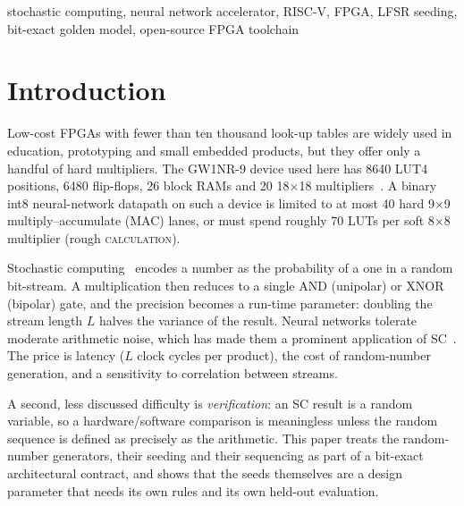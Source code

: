 \documentclass[conference]{IEEEtran}
\newcommand{\lbl}[1]{\textsc{#1}}    %
\begin{document}
\begin{IEEEkeywords}
stochastic computing, neural network accelerator, RISC-V, FPGA, LFSR seeding,
bit-exact golden model, open-source FPGA toolchain
\end{IEEEkeywords}

\section{Introduction}
\label{sec:intro}

Low-cost FPGAs with fewer than ten thousand look-up tables are widely used in
education, prototyping and small embedded products, but they offer only a
handful of hard multipliers. The GW1NR-9 device used here has 8640 LUT4
positions, 6480 flip-flops, 26 block RAMs and 20 18$\times$18
multipliers~\cite{sipeed_tn9k}.
A binary int8 neural-network datapath on such a device is limited to at most
40 hard 9$\times$9 multiply--accumulate (MAC) lanes, or must spend roughly 70
LUTs per soft 8$\times$8 multiplier (rough \lbl{calculation}).

Stochastic computing~\cite{gaines1969,alaghi2013survey} encodes a number as the
probability of a one in a random bit-stream. A multiplication then reduces to
a single AND (unipolar) or XNOR (bipolar) gate, and the precision becomes a
run-time parameter: doubling the stream length $L$ halves the variance of the
result. Neural networks tolerate moderate arithmetic noise, which has made them
a prominent application of SC~\cite{brown2001stochastic,%
kim2016dynamic,ren2017scdcnn}. The price is latency ($L$ clock cycles per
product), the cost of random-number generation, and a sensitivity to
correlation between streams.

A second, less discussed difficulty is \emph{verification}: an SC result is a
random variable, so a hardware/software comparison is meaningless unless the
random sequence is defined as precisely as the arithmetic. This paper treats
the random-number generators, their seeding and their sequencing as part of a
bit-exact architectural contract, and shows that the seeds themselves are a
design parameter that needs its own rules and its own held-out evaluation.
\end{document}
